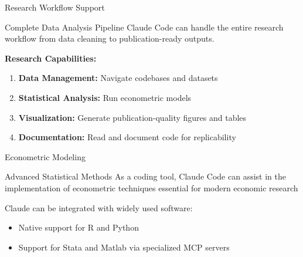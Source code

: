 \documentclass[10pt]{beamer}
\begin{document}
	\begin{frame}{Research Workflow Support}
		\begin{exampleblock}{Complete Data Analysis Pipeline}
			Claude Code can handle the entire research workflow from data cleaning to publication-ready outputs.
		\end{exampleblock}
		
		\vspace{0.3cm}
		
		\textbf{Research Capabilities:}
		\begin{enumerate}
			\item \textbf{Data Management:} Navigate codebases and datasets
			\item \textbf{Statistical Analysis:} Run econometric models
			\item \textbf{Visualization:} Generate publication-quality figures and tables
			\item \textbf{Documentation:} Read and document code for replicability
		\end{enumerate}
	\end{frame}
	
	\begin{frame}[fragile]{Econometric Modeling}
		\begin{alertblock}{Advanced Statistical Methods}
			As a coding tool, Claude Code can assist in the implementation of econometric techniques essential for modern economic research
		\end{alertblock}
		
		\vspace{0.5cm}
		
		Claude can be integrated with widely used software:
		\begin{itemize}
			\item Native support for R and Python
			\item Support for Stata and Matlab via specialized MCP servers
		\end{itemize}
	\end{frame}
	
\end{document}
